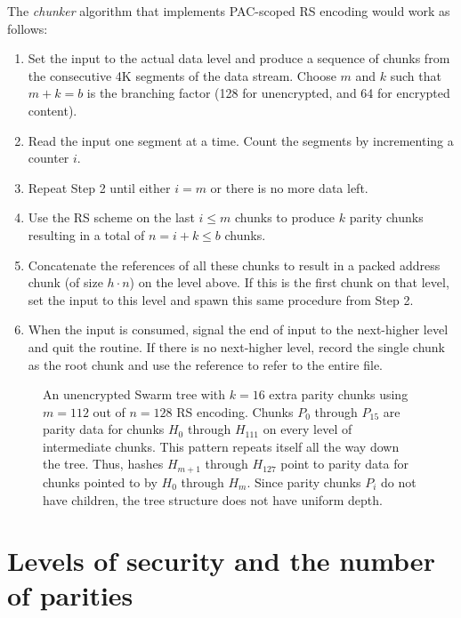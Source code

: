 \documentclass[manuscript,screen,review]{acmart}
\begin{document}
The \emph{chunker} algorithm that implements PAC-scoped RS encoding would work as follows:
\begin{enumerate}[noitemsep]
\item Set the input to the actual data level and produce a sequence of chunks from the consecutive 4K segments of the data stream. Choose $m$ and $k$ such that $m+k=b$ is the branching factor (128 for unencrypted, and 64 for encrypted content).
\item Read the input one segment at a time. Count the segments by incrementing a counter $i$.
\item Repeat Step 2 until either $i = m$ or there is no more data left.
\item Use the RS scheme on the last $i\leq m$ chunks to produce $k$ parity chunks resulting in a total of $n = i+k \leq b$ chunks.
\item Concatenate the references of all these chunks to result in a packed address chunk (of size $h\cdot n$) on the level above. If this is the first chunk on that level, set the input to this level and spawn this same procedure from Step 2.
\item When the input is consumed, signal the end of input to the next-higher level and quit the routine. If there is no next-higher level, record the single chunk as the root chunk and use the reference to refer to the entire file.
\end{enumerate}

\begin{figure}[!ht]
   \centering
   \resizebox{1\textwidth}{!}{
        
   }
   \caption[Swarm hash erasure]{An unencrypted Swarm tree with $k=16$ extra parity chunks using $m=112$ out of $n=128$ RS encoding. Chunks $P_{0}$ through $P_{15}$ are parity data for chunks $H_0 $ through $H_{111}$ on every level of intermediate chunks. This pattern repeats itself all the way down the tree. Thus, hashes $H_{m+1}$ through $H_{127}$ point to parity data for chunks pointed to by $H_0$ through $H_{m}$. Since parity chunks $P_i$ do not have children, the tree structure does not have uniform depth.}
   \label{fig:Swarm-hash-erasure}
\end{figure}

\section{Levels of security and the number of parities}\label{sec:levels}
\end{document}
